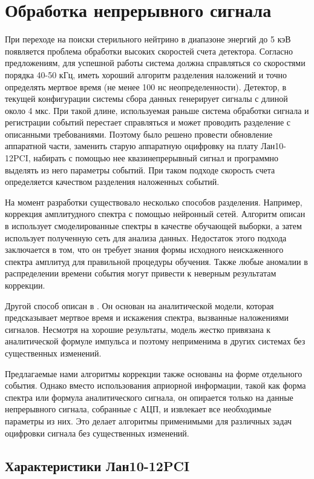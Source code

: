 \documentclass[a4paper,14pt]{extreport}
\begin{document}
\chapter{Обработка непрерывного сигнала}
При переходе на поиски стерильного нейтрино в диапазоне энергий до 5 кэВ появляется проблема обработки высоких скоростей счета детектора\cite{2015JInst..1010005A}. Согласно предложениям, для успешной работы система должна справляться со скоростями порядка 40-50 кГц, иметь хороший алгоритм разделения наложений и точно определять мертвое время (не менее 100 нс неопределенности). Детектор, в текущей конфигурации системы сбора данных генерирует сигналы с длиной около 4 мкс. При такой длине, используемая раньше система обработки сигнала и регистрации событий перестает справляться и может проводить разделение с описанными требованиями. Поэтому было решено провести обновление аппаратной части, заменить старую аппаратную оцифровку на плату Лан10-12PCI, набирать с помощью нее квазинепрерывный сигнал и программно выделять из него параметры событий. При таком подходе скорость счета определяется качеством разделения наложенных событий. 

На момент разработки существовало несколько способов разделения. Например, коррекция амплитудного спектра с помощью нейронный сетей. Алгоритм описан в  \cite{2017JHEP...12..051K} использует смоделированные спектры в качестве обучающей выборки, а затем использует полученную сеть для анализа данных. Недостаток этого подхода заключается в том, что он требует знания формы исходного неискаженного спектра амплитуд для правильной процедуры обучения. Также любые аномалии в распределении времени события могут привести к неверным результатам коррекции.

Другой способ описан в \cite{2013NIMPA.717...21C}. Он основан на аналитической модели, которая предсказывает мертвое время и искажения спектра, вызванные наложениями сигналов. Несмотря на хорошие результаты, модель жестко привязана к аналитической формуле импульса и поэтому неприменима в других системах без существенных изменений.

Предлагаемые нами алгоритмы коррекции также основаны на форме отдельного события. Однако вместо использования априорной информации, такой как форма спектра или формула аналитического сигнала, он опирается только на данные непрерывного сигнала, собранные с АЦП, и извлекает все необходимые параметры из них. Это делает алгоритмы применимыми для различных задач оцифровки сигнала без существенных изменений.

\section{Характеристики Лан10-12PCI}
\end{document}
